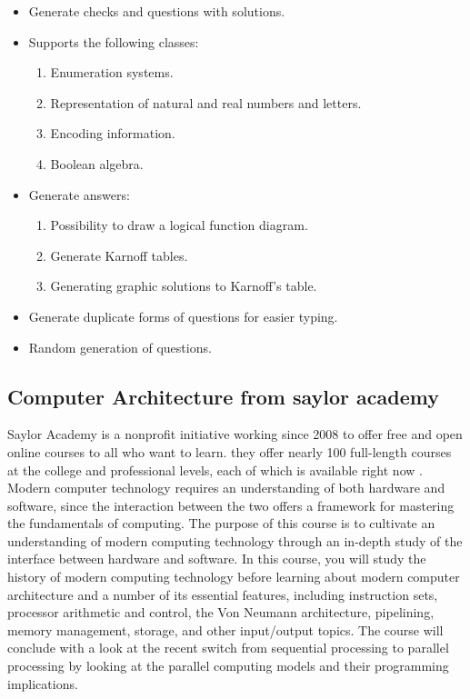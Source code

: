 \begin{itemize}
	\item Generate checks and questions with solutions.
	\item Supports the following classes:
	\begin{enumerate}
		\item Enumeration systems.
		\item Representation of natural and real numbers and letters.
		\item Encoding information.
		\item Boolean algebra.
	\end{enumerate}
	\item Generate answers:
	\begin{enumerate}
		\item Possibility to draw a logical function diagram.
		\item Generate Karnoff tables.
		\item Generating graphic solutions to Karnoff's table.
	\end{enumerate}
	\item Generate duplicate forms of questions for easier typing.
	\item Random generation of questions.
\end{itemize}

 

 \subsection{Computer Architecture from saylor academy}
 Saylor Academy is a nonprofit initiative working since 2008 to offer free and open online courses to all who want to learn.
  they offer nearly 100 full-length courses at the college and professional levels, each of which is available right now .
 Modern computer technology requires an understanding of both hardware and software, since the interaction between the two 
 offers a framework for mastering the fundamentals of computing. The purpose of this course is to cultivate an understanding 
 of modern computing technology through an in-depth study of the interface between hardware and software. In this course,
  you will study the history of modern computing technology before learning about modern computer architecture and a number
   of its essential features, including instruction sets, processor arithmetic and control, the Von Neumann architecture, 
   pipelining, memory management, storage, and other input/output topics. The course will conclude with a look at the recent 
   switch from sequential processing to parallel processing by looking at the parallel computing models and their programming 
   implications.\cite{Computer-Architecture-saylor-academy}
 
